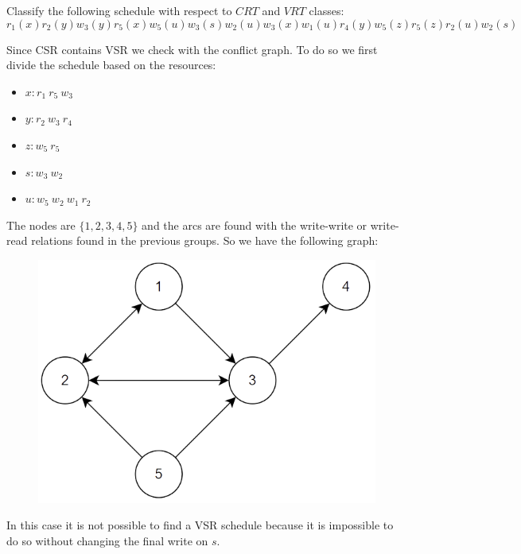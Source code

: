 \documentclass[12pt, a4paper]{report}
\newtheorem[style=M,bodystyle=\normalfont]{theorem}{Theorem}
\newtheorem[style=M,bodystyle=\normalfont]{corollary}{Corollary}
\newtheorem[style=M,bodystyle=\normalfont]{lemma}{Lemma}
\newtheorem[style=M,bodystyle=\normalfont]{definition}{Definition}
\begin{document}
    \begin{Exercise}[label=5]
        Classify the following schedule with respect to $CRT$ and $VRT$ classes: 
        \[r_1(x) r_2(y) w_3(y) r_5(x) w_5(u) w_3(s)w_2(u) w_3(x) w_1(u) r_4(y) w_5(z) r_5(z) r_2(u) w_2(s)\]
    \end{Exercise}
    \begin{Answer}[ref=5]
        Since CSR contains VSR we check with the conflict graph. To do so we first divide the schedule based on the resources: 
        \begin{itemize}
            \item $x: r_1 \: r_5 \: w_3$
            \item $y: r_2 \: w_3 \: r_4$
            \item $z: w_5 \: r_5$
            \item $s: w_3 \: w_2$
            \item $u: w_5 \: w_2 \: w_1 \: r_2$
        \end{itemize}
        The nodes are $\{1,2,3,4,5\}$ and the arcs are found with the write-write or write-read relations found in the previous groups. So we have the following graph:
        \begin{figure}[H]
            \centering
            \includegraphics[width=0.5\linewidth]{images/conflictgraph2.png}
        \end{figure}
        In this case it is not possible to find a VSR schedule because it is impossible to do so without changing the final write on $s$. 
    \end{Answer}

    \newpage
\end{document}
